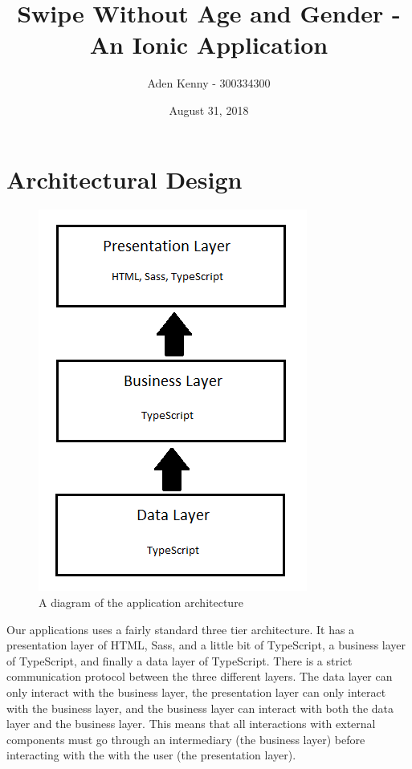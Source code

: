 \documentclass[a4paper, 11pt]{article}
\begin{document}
\title{Swipe Without Age and Gender - An Ionic Application}
\author{
Aden Kenny - 300334300
}
\date{August 31, 2018}
\maketitle



\section{Architectural Design}

\begin{figure}
\centering
\captionsetup{format=hang}
\includegraphics{arch.png}
\caption{A diagram of the application architecture}
\end{figure}

Our applications uses a fairly standard three tier architecture. It has a presentation layer of HTML, Sass, and a little bit of TypeScript, a business layer of TypeScript, and finally a data layer of TypeScript. There is a strict communication protocol between the three different layers. The data layer can only interact with the business layer, the presentation layer can only interact with the business layer, and the business layer can interact with both the data layer and the business layer. This means that all interactions with external components must go through an intermediary (the business layer) before interacting with the with the user (the presentation layer).
\end{document}

